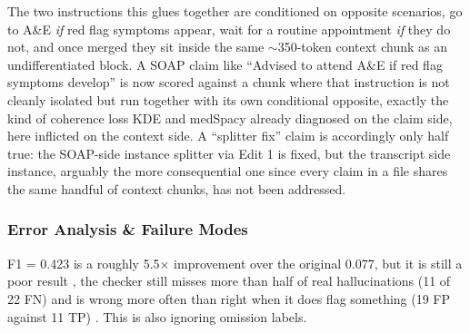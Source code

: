 \documentclass[11pt,a4paper]{article}
\begin{document}
The two instructions this glues together are conditioned on opposite scenarios, go to A\&E \emph{if} red flag symptoms appear, wait for a routine appointment \emph{if} they do not, and once merged they sit inside the same $\sim$350-token context chunk as an undifferentiated block. A SOAP claim like ``Advised to attend A\&E if red flag symptoms develop'' is now scored against a chunk where that instruction is not cleanly isolated but run together with its own conditional opposite, exactly the kind of coherence loss KDE and medSpacy already diagnosed on the claim side, here inflicted on the context side.  A ``splitter fix'' claim is accordingly only half true: the SOAP-side instance splitter via Edit 1 is fixed, but the transcript side instance, arguably the more consequential one since every claim in a file shares the same handful of context chunks, has not been addressed.

\subsubsection{Error Analysis \& Failure Modes}
F1 = 0.423  is a roughly 5.5× improvement over the original 0.077, but it is still a poor result , the checker still misses more than half of real hallucinations (11 of 22 FN) and is wrong more often than right when it does flag something (19 FP against 11 TP) .  This is also ignoring omission labels.
\end{document}

